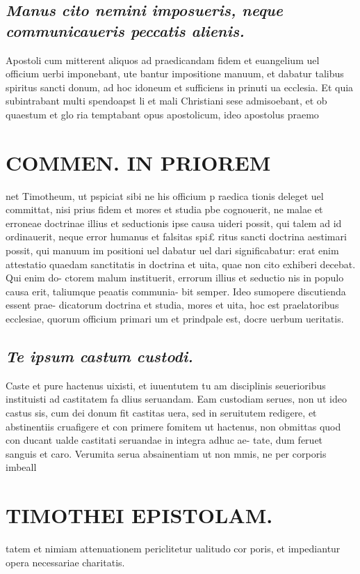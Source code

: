 \documentclass{article}
\begin{document}
\begin{pages}
\subsection*{\textit{Manus cito nemini imposueris, neque  communicaueris peccatis alienis. }}\pstart Apostoli cum mitterent aliquos ad praedicandam fidem et euangelium uel officium uerbi imponebant, ute bantur impositione manuum, et dabatur talibus spiritus sancti donum, ad hoc idoneum et sufficiens in prinuti ua ecclesia. Et quia subintrabant multi spendoapst li et mali Christiani sese admisoebant, et ob quaestum et glo ria temptabant opus apostolicum, ideo apostolus praemo  \pend
\section*{COMMEN. IN PRIOREM }
\marginpar{[ p.148 ]}\pstart net Timotheum, ut pspiciat sibi ne his officium p raedica tionis deleget uel committat, nisi prius fidem et mores et studia pbe cognouerit, ne malae et erroneae doctrinae illius et seductionis ipse causa uideri possit, qui talem ad id ordinauerit, neque error humanus et falsitas spi£ ritus sancti doctrina aestimari possit, qui manuum im positioni uel dabatur uel dari significabatur: erat enim attestatio quaedam sanctitatis in doctrina et uita, quae non cito exhiberi decebat. Qui enim do- ctorem malum instituerit, errorum illius et seductio nis in populo causa erit, taliumque peaatis communia- bit semper. Ideo sumopere discutienda essent prae- dicatorum doctrina et studia, mores et uita, hoc est praelatoribus ecclesiae, quorum officium primari um et prindpale est, docre uerbum ueritatis.  \pend
{}
{}
\subsection*{\textit{Te ipsum castum custodi. }}\pstart Caste et pure hactenus uixisti, et iuuentutem tu am disciplinis seuerioribus instituisti ad castitatem fa dlius seruandam. Eam custodiam serues, non ut ideo castus sis, cum dei donum fit castitas uera, sed in seruitutem redigere, et abstinentiis cruafigere et con primere fomitem ut hactenus, non obmittas quod con ducant ualde castitati seruandae in integra adhuc ae- tate, dum feruet sanguis et caro. Verumita serua absainentiam ut non mmis, ne per corporis imbeall  \pend
\section*{TIMOTHEI EPISTOLAM. }
\marginpar{[ p.149 ]}\pstart tatem et nimiam attenuationem periclitetur ualitudo cor poris, et impediantur opera necessariae charitatis.  \pend
{}
{}

\end{pages}
\end{document}
